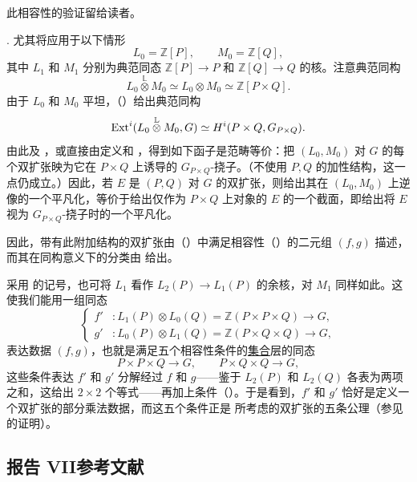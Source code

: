 此相容性的验证留给读者。

. 尤其将应用于以下情形
\[
 L_0=\mathbb Z[P],\qquad M_0=\mathbb Z[Q],
\]
其中 $L_1$ 和 $M_1$ 分别为典范同态 $\mathbb Z[P]\longrightarrow P$ 和 $\mathbb Z[Q]\longrightarrow Q$ 的核。注意典范同构
\[
 L_0\mathbin{\overset{\mathbb L}{\otimes}}M_0
 \simeq L_0\otimes M_0
 \simeq\mathbb Z[P\times Q].
\]
由于 $L_0$ 和 $M_0$ 平坦，（）给出典范同构
\[
 \operatorname{Ext}^i(L_0\mathbin{\overset{\mathbb L}{\otimes}}M_0,G)
 \simeq H^i(P\times Q,G_{P\times Q}).
\]
由此及 ，或直接由定义和 ，得到如下函子是范畴等价：把 $(L_0,M_0)$ 对 $G$ 的每个双扩张映为它在 $P\times Q$ 上诱导的 $G_{P\times Q}$-挠子。（不使用 $P,Q$ 的加性结构，这一点仍成立。）因此，若 $E$ 是 $(P,Q)$ 对 $G$ 的双扩张，则给出其在 $(L_0,M_0)$ 上逆像的一个平凡化，等价于给出仅作为 $P\times Q$ 上对象的 $E$ 的一个截面，即给出将 $E$ 视为 $G_{P\times Q}$-挠子时的一个平凡化。

因此，带有此附加结构的双扩张由（）中满足相容性（）的二元组 $(f,g)$ 描述，而其在同构意义下的分类由  给出。

采用  的记号，也可将 $L_1$ 看作 $L_2(P)\longrightarrow L_1(P)$ 的余核，对 $M_1$ 同样如此。这使我们能用一组同态
\[
\left\{
\begin{aligned}
 f'&:L_1(P)\otimes L_0(Q)
     =\mathbb Z(P\times P\times Q)\longrightarrow G,\\
 g'&:L_0(P)\otimes L_1(Q)
     =\mathbb Z(P\times Q\times Q)\longrightarrow G,
\end{aligned}
\right.
\]
表达数据 $(f,g)$，也就是满足五个相容性条件的\underline{集合}层的同态
\[
 P\times P\times Q\longrightarrow G,\qquad
 P\times Q\times Q\longrightarrow G,
\]
这些条件表达 $f'$ 和 $g'$ 分解经过 $f$ 和 $g$——鉴于 $L_2(P)$ 和 $L_2(Q)$ 各表为两项之和，这给出 $2\times2$ 个等式——再加上条件（）。于是看到，$f'$ 和 $g'$ 恰好是定义一个双扩张的部分乘法数据，而这五个条件正是  所考虑的双扩张的五条公理（参见  的证明）。

\subsection*{报告 VII参考文献}

